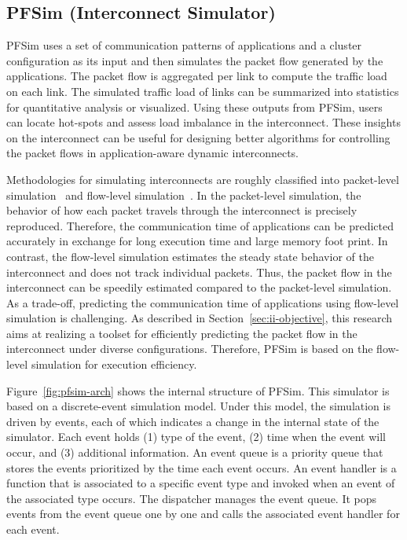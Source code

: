 \subsection{PFSim (Interconnect Simulator)}\label{sec:ii-pfsim}

PFSim uses a set of communication patterns of applications and a cluster
configuration as its input and then simulates the packet flow generated
by the applications. The packet flow is aggregated per link to compute
the traffic load on each link. The simulated traffic load of links can
be summarized into statistics for quantitative analysis or visualized.
Using these outputs from PFSim, users can locate hot-spots and assess
load imbalance in the interconnect. These insights on the interconnect
can be useful for designing better algorithms for controlling the packet
flows in application-aware dynamic interconnects.

Methodologies for simulating interconnects are roughly classified into
packet-level simulation~\cite{Hoefler2010} and flow-level
simulation~\cite{Schneider2009}. In the packet-level simulation, the behavior
of how each packet travels through the interconnect is precisely reproduced.
Therefore, the communication time of applications can be predicted accurately
in exchange for long execution time and large memory foot print. In contrast,
the flow-level simulation estimates the steady state behavior of the
interconnect and does not track individual packets. Thus, the packet flow in
the interconnect can be speedily estimated compared to the packet-level
simulation. As a trade-off, predicting the communication time of applications
using flow-level simulation is challenging. As described in
Section~\ref{sec:ii-objective}, this research aims at realizing a toolset for
efficiently predicting the packet flow in the interconnect under diverse
configurations. Therefore, PFSim is based on the flow-level simulation for
execution efficiency.

Figure~\ref{fig:pfsim-arch} shows the internal structure of PFSim. This
simulator is based on a discrete-event simulation model. Under this model, the
simulation is driven by events, each of which indicates a change in the
internal state of the simulator. Each event holds (1) type of the event, (2)
time when the event will occur, and (3) additional information. An event queue
is a priority queue that stores the events prioritized by the time each event
occurs. An event handler is a function that is associated to a specific event
type and invoked when an event of the associated type occurs. The dispatcher
manages the event queue. It pops events from the event queue one by one and
calls the associated event handler for each event.


